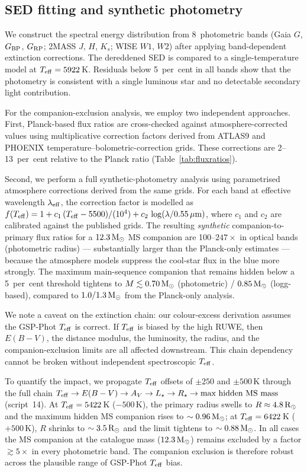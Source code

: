 \documentclass[usenatbib,fleqn]{mnras}
\newcommand{\Msun}{{\rm M}_\odot}
\newcommand{\Rsun}{{\rm R}_\odot}
\begin{document}
\subsection{SED fitting and synthetic photometry}
\label{sec:methods:sed}

We construct the spectral energy distribution from 8~photometric
bands (Gaia $G$, $G_{\rm BP}$, $G_{\rm RP}$; 2MASS $J$, $H$,
$K_s$; WISE $W1$, $W2$) after applying band-dependent extinction
corrections.  The dereddened SED is compared to a single-temperature
model at $T_{\rm eff} = 5922$\,K.  Residuals below
5~per~cent in all bands show that the photometry is consistent
with a single luminous star and no detectable secondary light
contribution.

For the companion-exclusion analysis, we employ two independent
approaches.  First, Planck-based flux ratios are cross-checked
against atmosphere-corrected values using multiplicative
correction factors derived from ATLAS9 \citep{Castelli2003} and
PHOENIX \citep{Husser2013} temperature--bolometric-correction
grids.  These corrections are 2--13~per~cent relative to the
Planck ratio (Table~\ref{tab:fluxratios}).

Second, we perform a full synthetic-photometry analysis using
parametrised atmosphere corrections derived from the same grids.
For each band at effective wavelength $\lambda_{\rm eff}$, the
correction factor is modelled as
$f(T_{\rm eff}) = 1 + c_1\,(T_{\rm eff} - 5500)/(10^4) + c_2\,\log(\lambda/0.55\,\mu{\rm m})$,
where $c_1$ and $c_2$ are calibrated against the published grids.
The resulting \emph{synthetic} companion-to-primary flux ratios
for a $12.3\,\Msun$ MS companion are 100--$247\times$ in
optical bands (photometric radius) --- substantially larger than
the Planck-only estimates --- because the atmosphere models
suppress the cool-star flux in the blue more strongly.
The maximum main-sequence companion that remains hidden below a
5~per~cent threshold tightens to
$M \lesssim 0.70\,\Msun$ (photometric) /
$0.85\,\Msun$ (logg-based), compared to $1.0/1.3\,\Msun$ from
the Planck-only analysis.

We note a caveat on the extinction chain:
our colour-excess derivation assumes the GSP-Phot $T_{\rm eff}$
is correct.  If $T_{\rm eff}$ is biased by the high RUWE, then
$E(B-V)$, the distance modulus, the luminosity, the radius, and
the companion-exclusion limits are all affected downstream.
This chain dependency cannot be broken without independent
spectroscopic $T_{\rm eff}$.

To quantify the impact, we propagate $T_{\rm eff}$ offsets of
$\pm 250$ and $\pm 500\,$K through the full chain
$T_{\rm eff} \to E(B-V) \to A_V \to L_\star \to R_\star \to
\text{max hidden MS mass}$ (script~14).
At $T_{\rm eff} = 5422\,$K ($-500$\,K), the primary radius
swells to $R \approx 4.8\,\Rsun$ and the maximum hidden MS
companion rises to $\sim 0.96\,\Msun$; at
$T_{\rm eff} = 6422\,$K ($+500$\,K), $R$ shrinks to
$\sim 3.5\,\Rsun$ and the limit tightens to
$\sim 0.88\,\Msun$.  In all cases the MS companion at the
catalogue mass ($12.3\,\Msun$) remains excluded by a factor
$\gtrsim 5\times$ in every photometric band.  The companion
exclusion is therefore robust across the plausible range of
GSP-Phot $T_{\rm eff}$ bias.
\end{document}
